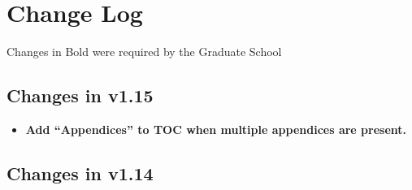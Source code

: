\chapter{Change Log}
Changes in Bold were required by the Graduate School

\section{Changes in v1.15}
\begin{itemize}
\item{\bfseries Add “Appendices” to TOC when multiple appendices are present.}
\end{itemize}

\section{Changes in v1.14}
